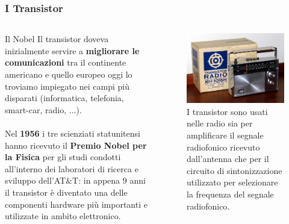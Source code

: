 \begin{frame}
	\frametitle{I Transistor}
	
	\begin{columns}			
		\begin{block}{Il Nobel}
			Il transistor doveva inizialmente servire a \textbf{migliorare le comunicazioni} tra il continente americano e quello europeo oggi lo troviamo impiegato nei campi più disparati (informatica, telefonia, smart-car, radio, ...).\\~\\
			Nel \textbf{1956} i tre scienziati statunitensi hanno ricevuto il \textbf{Premio Nobel per la Fisica} per gli studi condotti all'interno dei laboratori di ricerca e sviluppo dell'AT\&T: in appena 9 anni il transistor è diventato una delle componenti hardware più importanti e utilizzate in ambito elettronico.
		\end{block}
		
		\begin{figure}[!htbp]
			\centering 
			\includegraphics[width=0.95\linewidth]{images/2_elettronica/radio_transistors.jpeg}
			\caption{I transistor sono usati nelle radio sia per amplificare il segnale radiofonico   ricevuto dall'antenna che per il circuito di sintonizzazione utilizzato per selezionare la frequenza del segnale radiofonico.}
		\end{figure}		
	\end{columns}
	
\end{frame}


